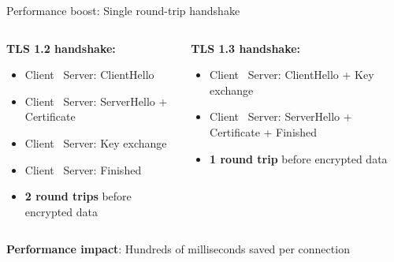 \documentclass[aspectratio=169, lualatex, handout]{beamer}
\begin{document}
\begin{frame}{Performance boost: Single round-trip handshake}
	\begin{columns}[c]
		\begin{column}{0.5\textwidth}
			\textbf{TLS 1.2 handshake:}
			\begin{itemize}[<+->]
				\item Client \rightarrow\ Server: ClientHello
				\item Client \leftarrow\ Server: ServerHello + Certificate
				\item Client \rightarrow\ Server: Key exchange
				\item Client \leftarrow\ Server: Finished
				\item \textbf{2 round trips} before encrypted data
			\end{itemize}
		\end{column}
		\begin{column}{0.5\textwidth}
			\textbf{TLS 1.3 handshake:}
			\begin{itemize}[<+->]
				\item Client \rightarrow\ Server: ClientHello + Key exchange
				\item Client \leftarrow\ Server: ServerHello + Certificate + Finished
				\item \textbf{1 round trip} before encrypted data
			\end{itemize}
		\end{column}
	\end{columns}
	\pause
	\begin{center}
		\textbf{Performance impact}: Hundreds of milliseconds saved per connection
	\end{center}
\end{frame}
\end{document}
